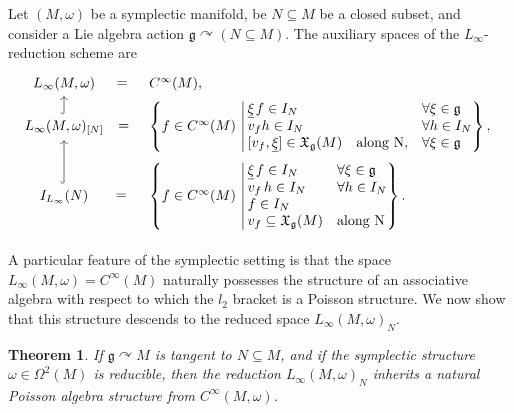 \documentclass[pdftex]{sigma}
\numberwithin{equation}{section}
\newtheorem{Theorem}{Theorem}[section]
\DeclareMathOperator{\action}{\curvearrowright}
\newcommand{\g}{\mathfrak{g}}
\newcommand{\fgmodule}{\mathfrak{X}_{\g}}
\renewcommand{\subset}{\subseteq}
\begin{document}
Let $(M,\omega)$ be a symplectic manifold, be $N\subset M$ be a closed subset, and consider a Lie algebra action $\mathfrak{g}\action (N\subset M)$.
The auxiliary spaces of the $L_\infty$-reduction scheme are
\begin{equation}\label{diagram:symplectic-ingredients}
	\begin{tikzcd}[
		ampersand replacement = \&
		,row sep = 0ex
		,/tikz/column 2/.append style={anchor=base west}
		]
		L_\infty(M,\omega) \ar[r,phantom,"="] \&
		C^\infty(M),
		\\
		L_\infty(M,\omega)_{[N]} \ar[r,phantom,pos=0.42,"="] \ar[u,hook]\&
		\left\lbrace
		f\in C^\infty(M)
		\,\left\vert \,
		\begin{array}{@{}l r l@{}}
			\underline\xi\hspace{1pt} f \in I_N &&\forall \xi \in \mathfrak{g}\\
			v_f h\in I_N && \forall h \in I_N
			\\
			{[v_f,\underline{\xi}]} \in \fgmodule(M)  & \text{along N},
			& \forall \xi \in \g
		\end{array}
		\right\rbrace,\right.
		\\
		I_{L_\infty}(N) \ar[r,phantom,pos=0.55,"="] \ar[u,hook]\&
		\left\lbrace
		f\in C^\infty(M)
		\,\left\vert \,
		\begin{array}{@{}l l@{}}
			\underline\xi\hspace{1pt} f \in I_N & \forall \xi \in \mathfrak{g}\\
			v_f \,h \in I_N & \forall h \in I_N
			\\
			f \in I_N\\
			v_f \subset \fgmodule(M) & \text{along N}
		\end{array}
		\right\rbrace.\right.
	\end{tikzcd}
\end{equation}

A particular feature of the symplectic setting is that the space $L_\infty(M,\omega)=C^\infty(M)$ naturally possesses the structure of an associative algebra with respect to which the $l_2$ bracket is a Poisson structure. We now show that this structure descends to the reduced space $L_\infty(M,\omega)_N$.

\begin{Theorem}%
	If $\g\curvearrowright M$ is tangent to $N\subset M$, and if the symplectic structure $\omega\in\Omega^2(M)$ is reducible, then the reduction $L_\infty(M,\omega)_N$ inherits a natural Poisson algebra structure from $C^\infty(M,\omega)$.
\end{Theorem}
\end{document}
